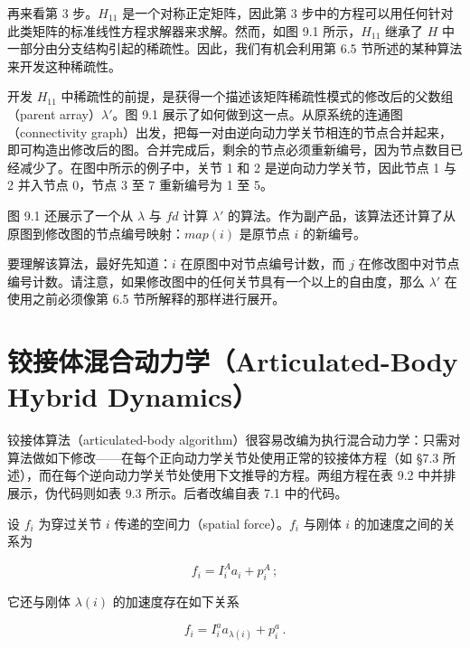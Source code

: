 \documentclass[10pt,a4paper]{book}
\theoremstyle{thmstyle} %
\theoremstyle{defstyle} %
\theoremstyle{prostyle} %
\begin{document}
再来看第 3 步。$H_{11}$ 是一个对称正定矩阵，因此第 3 步中的方程可以用任何针对此类矩阵的标准线性方程求解器来求解。然而，如图 9.1 所示，$H_{11}$ 继承了 $H$ 中一部分由分支结构引起的稀疏性。因此，我们有机会利用第 6.5 节所述的某种算法来开发这种稀疏性。



开发 $H_{11}$ 中稀疏性的前提，是获得一个描述该矩阵稀疏性模式的修改后的父数组（parent array）$\lambda'$。图 9.1 展示了如何做到这一点。从原系统的连通图（connectivity graph）出发，把每一对由逆向动力学关节相连的节点合并起来，即可构造出修改后的图。合并完成后，剩余的节点必须重新编号，因为节点数目已经减少了。在图中所示的例子中，关节 1 和 2 是逆向动力学关节，因此节点 1 与 2 并入节点 0，节点 3 至 7 重新编号为 1 至 5。



图 9.1 还展示了一个从 $\lambda$ 与 $fd$ 计算 $\lambda'$ 的算法。作为副产品，该算法还计算了从原图到修改图的节点编号映射：$map(i)$ 是原节点 $i$ 的新编号。



要理解该算法，最好先知道：$i$ 在原图中对节点编号计数，而 $j$ 在修改图中对节点编号计数。请注意，如果修改图中的任何关节具有一个以上的自由度，那么 $\lambda'$ 在使用之前必须像第 6.5 节所解释的那样进行展开。



\section{铰接体混合动力学（Articulated-Body Hybrid Dynamics）}





铰接体算法（articulated-body algorithm）很容易改编为执行混合动力学：只需对算法做如下修改——在每个正向动力学关节处使用正常的铰接体方程（如 §7.3 所述），而在每个逆向动力学关节处使用下文推导的方程。两组方程在表 9.2 中并排展示，伪代码则如表 9.3 所示。后者改编自表 7.1 中的代码。



设 $f_{i}$ 为穿过关节 $i$ 传递的空间力（spatial force）。$f_{i}$ 与刚体 $i$ 的加速度之间的关系为



$$
f _ { i } = I _ { i } ^{A} a _ { i } + p _ { i } ^{A} \, ;
$$



它还与刚体 $\lambda(i)$ 的加速度存在如下关系



$$
f _ { i } = I _ { i } ^{a} a _ { \lambda ( i ) } + p _ { i } ^{a} \, .
$$
\end{document}
